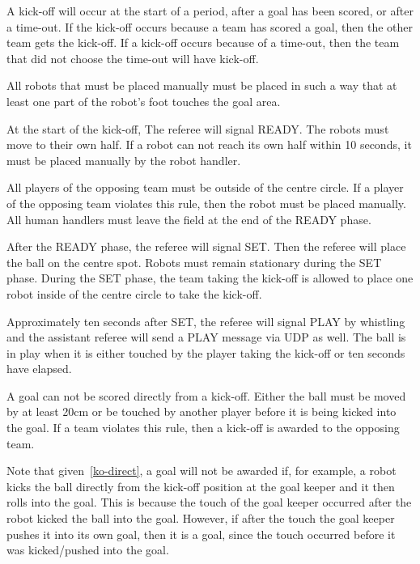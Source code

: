 \documentclass[12pt]{hurocup}
\begin{document}
\begin{lawlist}[US]

\item A kick-off will occur at the start of a period, after a goal has
  been scored, or after a time-out. If the kick-off occurs because a
  team has scored a goal, then the other team gets the kick-off. If a
  kick-off occurs because of a time-out, then the team that did not
  choose the time-out will have kick-off.

\item All robots that must be placed manually must be placed in such a
  way that at least one part of the robot's foot touches the goal
  area.

\item At the start of the kick-off, The referee will signal READY. The
  robots must move to their own half. If a robot can not reach its own
  half within 10 seconds, it must be placed manually by the robot
  handler.
  
\item All players of the opposing team must be outside of the centre
  circle. If a player of the opposing team violates this rule, then
  the robot must be placed manually. All human handlers must leave the
  field at the end of the READY phase.

\item After the READY phase, the referee will signal SET. Then the
  referee will place the ball on the centre spot. Robots must remain
  stationary during the SET phase. During the SET phase, the team
  taking the kick-off is allowed to place one robot inside of the
  centre circle to take the kick-off.

\item Approximately ten seconds after SET, the referee will signal
  PLAY by whistling and the assistant referee will send a PLAY message
  via UDP as well. The ball is in play when it is either touched by
  the player taking the kick-off or ten seconds have elapsed.

\item \label{ko-direct} A goal can not be scored directly from a
  kick-off. Either the ball must be moved by at least 20cm or be
  touched by another player before it is being kicked into the goal.
  If a team violates this rule, then a kick-off is awarded to the
  opposing team.

\end{lawlist}

\begin{decisions}
\item Note that given~\ref{ko-direct}, a goal will not be awarded if,
  for example, a robot kicks the ball directly from the kick-off
  position at the goal keeper and it then rolls into the goal. This is
  because the touch of the goal keeper occurred after the robot kicked
  the ball into the goal. However, if after the touch the goal keeper
  pushes it into its own goal, then it is a goal, since the touch
  occurred before it was kicked/pushed into the goal.
\end{decisions}
\end{document}
